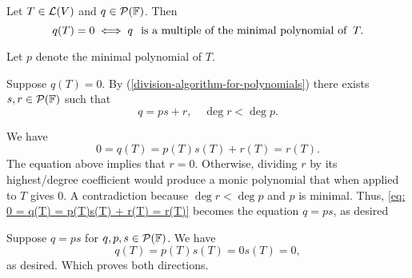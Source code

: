 \setcounter{thm}{28}
\begin{thm}
  \label{thm: every zero polynomial is a multiple of the minimal polynomial}
  Let $T\in \mathcal{L}(V)$ and $q \in \mathcal{P} (\mathbb{F})$. Then
  \begin{equation}
    q(T)=0 \iff q \;\;\, \text{is a multiple of the minimal polynomial of}\;\; T.
  \end{equation}
\end{thm}
\begin{prf}
  Let $p$ denote the minimal polynomial of $T$.

  \begin{description}

    \item{\Rightarrowdirection}{
      Suppose $q(T)=0$.
      By (\ref{division-algorithm-for-polynomials}) there exists $s,r \in \mathcal{P} (\mathbb{F})$ such that
      \begin{equation}
        q=ps+r, \quad \deg r < \deg p.
      \end{equation}

      We have
      \begin{equation}
        \label{eq: 0 = q(T) = p(T)s(T) + r(T) = r(T)}
        0 = q(T) = p(T)s(T) + r(T) = r(T).
      \end{equation}
      The equation above implies that $r=0$. Otherwise, dividing $r$ by its highest\-/degree coefficient would produce a monic polynomial that when applied to $T$ gives $0$. A contradiction because $\deg r < \deg p$ and $p$ is minimal. Thus, \eqref{eq: 0 = q(T) = p(T)s(T) + r(T) = r(T)} becomes the equation $q=ps$, as desired
    }
    \item{\Leftarrowdirection}{
      Suppose $q=ps$ for $q,p,s \in \mathcal{P}(\mathbb{F})$. We have
      \begin{equation}
        q(T) = p(T)s(T)=0s(T)=0,
      \end{equation}
      as desired. Which proves both directions.
    }
  \end{description}
   \vspace*{-\baselineskip}
\end{prf}

